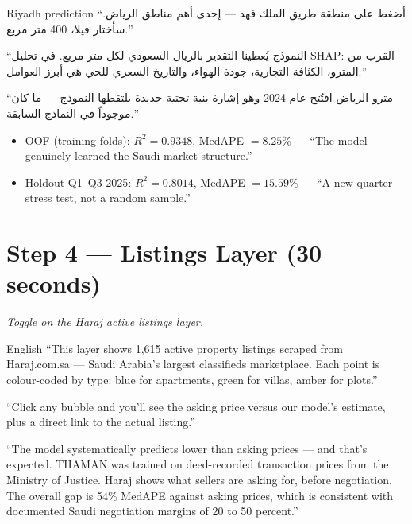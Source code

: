 \documentclass[11pt, a4paper, twoside]{article}
\begin{document}
\begin{arabic}{Riyadh prediction}
``أضغط على منطقة طريق الملك فهد --- إحدى أهم مناطق الرياض. سأختار فيلا،
400 متر مربع.''

``النموذج يُعطينا التقدير بالريال السعودي لكل متر مربع. في تحليل SHAP: القرب
من المترو، الكثافة التجارية، جودة الهواء، والتاريخ السعري للحي هي أبرز
العوامل.''

``مترو الرياض افتُتح عام 2024 وهو إشارة بنية تحتية جديدة يلتقطها النموذج ---
ما كان موجوداً في النماذج السابقة.''
\end{arabic}

\begin{tcolorbox}[colback=blue!5,colframe=blue!60,title=\textbf{Metrics to highlight}]
\begin{itemize}
  \item OOF (training folds): $R^2 = 0.9348$, MedAPE $= 8.25\%$ ---
        ``The model genuinely learned the Saudi market structure.''
  \item Holdout Q1--Q3 2025: $R^2 = 0.8014$, MedAPE $= 15.59\%$ ---
        ``A new-quarter stress test, not a random sample.''
\end{itemize}
\end{tcolorbox}

\section{Step 4 --- Listings Layer (30 seconds)}
\label{sec:listings}

\noindent\textit{Toggle on the Haraj active listings layer.}

\begin{narration}{English}
``This layer shows 1,615 active property listings scraped from Haraj.com.sa ---
Saudi Arabia's largest classifieds marketplace. Each point is colour-coded by
type: blue for apartments, green for villas, amber for plots.''

``Click any bubble and you'll see the asking price versus our model's estimate,
plus a direct link to the actual listing.''

``The model systematically predicts lower than asking prices --- and that's
expected. THAMAN was trained on deed-recorded transaction prices from the
Ministry of Justice. Haraj shows what sellers are asking for, before
negotiation. The overall gap is 54\% MedAPE against asking prices, which is
consistent with documented Saudi negotiation margins of 20 to 50 percent.''
\end{narration}
\end{document}
